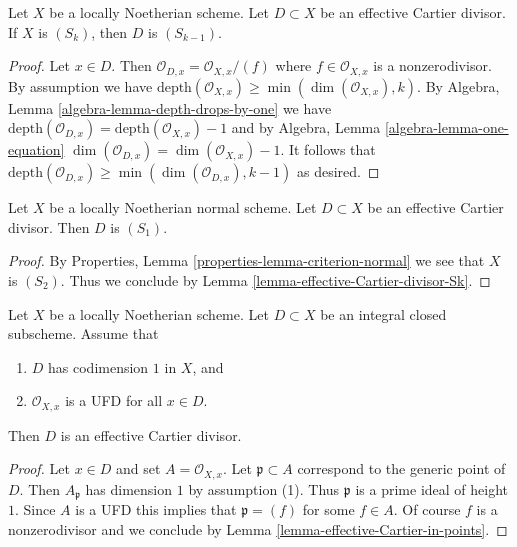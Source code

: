 \begin{lemma}
\label{lemma-effective-Cartier-divisor-Sk}
Let $X$ be a locally Noetherian scheme. Let $D \subset X$ be an
effective Cartier divisor. If $X$ is $(S_k)$, then $D$ is $(S_{k - 1})$.
\end{lemma}

\begin{proof}
Let $x \in D$. Then $\mathcal{O}_{D, x} = \mathcal{O}_{X, x}/(f)$ where
$f \in \mathcal{O}_{X, x}$ is a nonzerodivisor. By assumption we have
$\text{depth}(\mathcal{O}_{X, x}) \geq \min(\dim(\mathcal{O}_{X, x}), k)$.
By Algebra, Lemma \ref{algebra-lemma-depth-drops-by-one} we have
$\text{depth}(\mathcal{O}_{D, x}) = \text{depth}(\mathcal{O}_{X, x}) - 1$
and by Algebra, Lemma \ref{algebra-lemma-one-equation}
$\dim(\mathcal{O}_{D, x}) = \dim(\mathcal{O}_{X, x}) - 1$.
It follows that
$\text{depth}(\mathcal{O}_{D, x}) \geq \min(\dim(\mathcal{O}_{D, x}), k - 1)$
as desired.
\end{proof}

\begin{lemma}
\label{lemma-normal-effective-Cartier-divisor-S1}
Let $X$ be a locally Noetherian normal scheme. Let $D \subset X$ be an
effective Cartier divisor. Then $D$ is $(S_1)$.
\end{lemma}

\begin{proof}
By Properties, Lemma \ref{properties-lemma-criterion-normal}
we see that $X$ is $(S_2)$. Thus we conclude by
Lemma \ref{lemma-effective-Cartier-divisor-Sk}.
\end{proof}

\begin{lemma}
\label{lemma-weil-divisor-is-cartier-UFD}
Let $X$ be a locally Noetherian scheme. Let $D \subset X$ be an integral
closed subscheme. Assume that
\begin{enumerate}
\item $D$ has codimension $1$ in $X$, and
\item $\mathcal{O}_{X, x}$ is a UFD for all $x \in D$.
\end{enumerate}
Then $D$ is an effective Cartier divisor.
\end{lemma}

\begin{proof}
Let $x \in D$ and set $A = \mathcal{O}_{X, x}$. Let $\mathfrak p \subset A$
correspond to the generic point of $D$. Then $A_\mathfrak p$ has dimension
$1$ by assumption (1). Thus $\mathfrak p$ is a prime ideal of height $1$.
Since $A$ is a UFD this implies that $\mathfrak p = (f)$ for some $f \in A$.
Of course $f$ is a nonzerodivisor and we conclude by
Lemma \ref{lemma-effective-Cartier-in-points}.
\end{proof}

